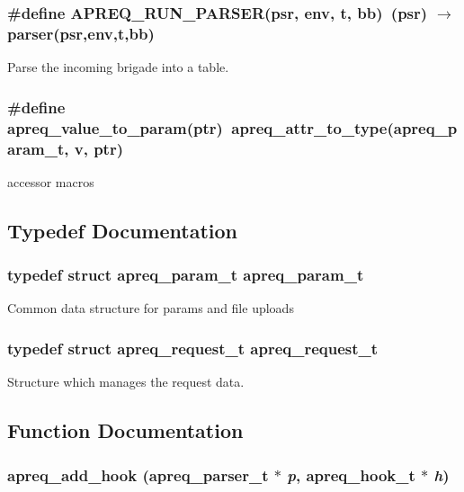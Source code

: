 \subsubsection{\setlength{\rightskip}{0pt plus 5cm}\#define APREQ\_\-RUN\_\-PARSER(psr, env, t, bb)\ (psr) $\rightarrow$ parser(psr,env,t,bb)}\label{group__params_a32}


Parse the incoming brigade into a table. 
\subsubsection{\setlength{\rightskip}{0pt plus 5cm}\#define apreq\_\-value\_\-to\_\-param(ptr)\ apreq\_\-attr\_\-to\_\-type({\bf apreq\_\-param\_\-t}, v, ptr)}\label{group__params_a22}


accessor macros 

\subsection{Typedef Documentation}
\subsubsection{\setlength{\rightskip}{0pt plus 5cm}typedef struct apreq\_\-param\_\-t  apreq\_\-param\_\-t}\label{group__params_a0}


Common data structure for params and file uploads 
\subsubsection{\setlength{\rightskip}{0pt plus 5cm}typedef struct apreq\_\-request\_\-t  apreq\_\-request\_\-t}\label{group__params_a3}


Structure which manages the request data. 

\subsection{Function Documentation}
\subsubsection{ apreq\_\-add\_\-hook ({\bf apreq\_\-parser\_\-t} $\ast$ {\em p}, {\bf apreq\_\-hook\_\-t} $\ast$ {\em h})}\label{group__params_a20}


